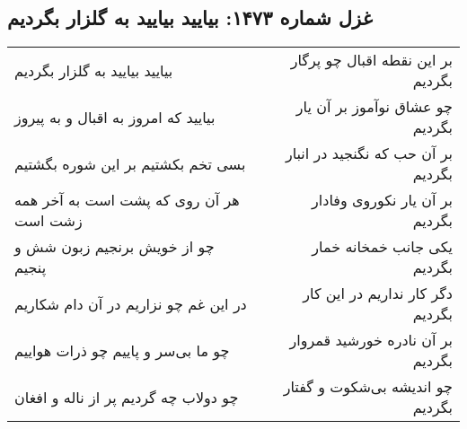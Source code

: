 \begin{center}
\section*{غزل شماره ۱۴۷۳: بیایید بیایید به گلزار بگردیم}
\label{sec:1473}
\begin{longtable}{l p{0.5cm} r}
بیایید بیایید به گلزار بگردیم
&&
بر این نقطه اقبال چو پرگار بگردیم
\\
بیایید که امروز به اقبال و به پیروز
&&
چو عشاق نوآموز بر آن یار بگردیم
\\
بسی تخم بکشتیم بر این شوره بگشتیم
&&
بر آن حب که نگنجید در انبار بگردیم
\\
هر آن روی که پشت است به آخر همه زشت است
&&
بر آن یار نکوروی وفادار بگردیم
\\
چو از خویش برنجیم زبون شش و پنجیم
&&
یکی جانب خمخانه خمار بگردیم
\\
در این غم چو نزاریم در آن دام شکاریم
&&
دگر کار نداریم در این کار بگردیم
\\
چو ما بی‌سر و پاییم چو ذرات هواییم
&&
بر آن نادره خورشید قمروار بگردیم
\\
چو دولاب چه گردیم پر از ناله و افغان
&&
چو اندیشه بی‌شکوت و گفتار بگردیم
\\
\end{longtable}
\end{center}
